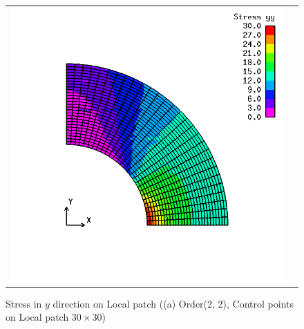 \begin{figure}[htbp]
  \begin{tabular}{cc}
    \begin{minipage}[t]{0.45\hsize}
      \centering
      \includegraphics[keepaspectratio, scale=0.3]
      {fig/result_data_etc/s-iga01/contour/2_2.png}
      \caption{Stress in $y$ direction on Local patch ((a) Order(2, 2), Control points on Local patch $30\times 30$)}
      \label{fig:contour22}
    \end{minipage} &
    \begin{minipage}[t]{0.45\hsize}
      \centering
      \includegraphics[keepaspectratio, scale=0.3]

\end{minipage}
\end{tabular}
\end{figure}
